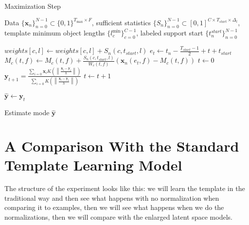 \documentclass{article}
\begin{document}
\begin{algorithm}
\caption{Maximization Step}
\label{alg-max_step}
    \begin{algorithmic}[1]
      \REQUIRE Data $\{\mathbf{x}_n\}_{n=0}^{N-1}\subset \{0,1\}^{T_{\max}\times F}$, sufficient statistics $\{S_n\}_{n=0}^{N-1} \subset [0,1]^{C\times T_{start}\times \Delta_l} $, template minimum object lengths $\{l_c^{\min}\}_{c=0}^{C-1}$,
        labeled support start $\{t_n^{start}\}_{n=0}^{N-1}$
       
                      \STATE $weights[c,l] \gets weights[c,l] + S_n(c,t_{start},l)$
                  \ENDFOR
              \ENDFOR
              \STATE {}
                  \STATE $e_t\gets t_n - \frac{T_{start}-1}{2}+t+t_{start}$
                              \STATE $M_c(t,f)\gets M_c(t,f) + \frac{S_n(c,t_{start},l)}{W_c(t,f)} (\mathbf{x}_n(e_t,f) - M_c(t,f))$
                          \ENDFOR
                      \ENDIF
                  \ENDFOR
              \ENDFOR
              \ENDFOR
          \ENDFOR
      \ENDFOR
      \STATE $t\gets 0$
      \REPEAT
        \STATE $\mathbf{y}_{t+1} = \frac{\sum_{i=0}\mathbf{x}_i K\left(\left\|\frac{\mathbf{x}_i-\mathbf{y}_t}{h}\right\|\right)}{\sum_{i=0} K\left(\left\|\frac{\mathbf{x}_i-\mathbf{y}_t}{h}\right\|\right)}$
        \STATE $t\gets t+1$

      \STATE $\hat{\mathbf{y}}\gets \mathbf{y}_t$

      \ENSURE Estimate mode $\hat{\mathbf{y}}$
    \end{algorithmic}

\end{algorithm}



\section{A Comparison With the Standard Template Learning Model}

The structure of the experiment looks like this: we will learn the template in the traditional way
and then see what happens with no normalization when comparing it to examples,
then we will see what happens when we do the normalizations,
then we will compare with the enlarged latent space models.
\end{document}
